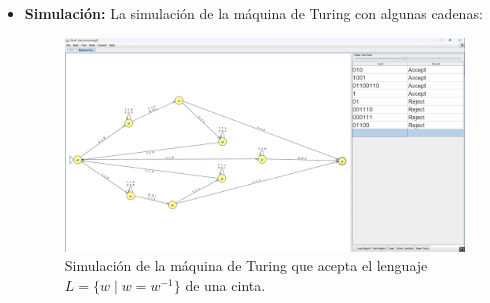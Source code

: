 \documentclass[11pt]{report}
\begin{document}
\begin{itemize}
  \item \textbf{Simulación:} La simulación de la máquina de Turing con algunas cadenas:
        \begin{figure}[H]
          \centering
          \includegraphics[scale=0.33]{img/MT_04_one_ribbon_simulation.png}
          \caption{Simulación de la máquina de Turing que acepta el lenguaje \(L = \{w \mid w = w^{-1}\}\) de una cinta.}
          \label{fig:simulacion de la maquina de turing que acepta el lenguaje L = {w | w = w^{-1}} de una cinta}
        \end{figure}
\end{itemize}

\newpage
\end{document}
